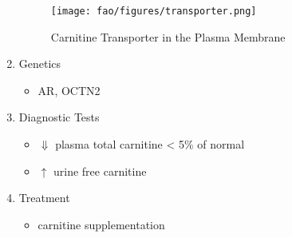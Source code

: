 \documentclass[12pt]{scrartcl}
\begin{document}
\begin{enumerate}
\begin{figure}[htbp]
\centering
\texttt{[image: fao/figures/transporter.png]}
\caption{\label{fig:org92b2937}Carnitine Transporter in the Plasma Membrane}
\end{figure}

\item Genetics
\label{sec:orgcdab24b}
\begin{itemize}
\item AR, OCTN2
\end{itemize}
\item Diagnostic Tests
\label{sec:org03dd303}
\begin{itemize}
\item \(\Downarrow\) plasma total carnitine \textless{} 5\% of normal
\item \(\uparrow\) urine free carnitine
\end{itemize}
\item Treatment
\label{sec:org5e1b9a0}
\begin{itemize}
\item carnitine supplementation
\end{itemize}
\end{enumerate}
\end{document}
